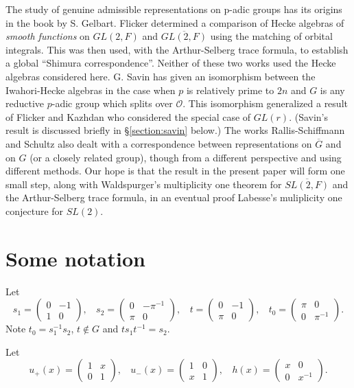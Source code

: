 \documentclass[12pt,letterpaper]{amsart}
\theoremstyle{definition}
\theoremstyle{remark}
\begin{document}
The study of genuine admissible representations
on p-adic groups has its origins in the
book \cite{G} by S. Gelbart. Flicker \cite{F}
determined a comparison of Hecke algebras of
{\it smooth functions} on $GL(2,F)$ and 
$\overline{GL(2,F)}$ using the matching of orbital integrals.
This was then used, with the Arthur-Selberg trace formula, to 
establish a global ``Shimura correspondence''.
Neither of these two works used the Hecke algebras considered here.
G. Savin \cite{S} has given an isomorphism between
the Iwahori-Hecke algebras in the case when $p$ is
relatively prime to $2n$ and $G$ is any reductive
$p$-adic group which splits over $\mathcal{O}$. This isomorphism 
generalized a result of Flicker and Kazhdan \cite{FK} who
considered the special case of $GL(r)$. 
(Savin's result is discussed briefly
in \S \ref{section:savin} below.)
The works Rallis-Schiffmann \cite{RS} and Schultz
\cite{Sch} also dealt with a correspondence between
representations on $\overline{G}$ and on $G$ (or a closely related 
group),
though from a different perspective and using different methods.
Our hope is that the result in the present paper will form
one small step, along with Waldspurger's
multiplicity one theorem for $\overline{SL(2,F)}$ 
\cite{W} and the Arthur-Selberg trace formula, in an eventual proof 
Labesse's muliplicity one conjecture for $SL(2)$. 

\section{Some notation}

Let
\[
s_1=
\left(
\begin{array}{cc}
0 & -1\\
1 & 0
\end{array}
\right),\ \ \ \ 
s_2=
\left(
\begin{array}{cc}
0 & -\pi^{-1}\\
\pi & 0
\end{array}
\right),\ \ \ \ 
t=
\left(
\begin{array}{cc}
0 & -1\\
\pi & 0
\end{array}
\right),\ \ \ \ 
t_0=
\left(
\begin{array}{cc}
\pi & 0 \\
0 & \pi^{-1}
\end{array}
\right).
\]
Note $t_0=s_1^{-1}s_2$, $t\notin G$ and $ts_1t^{-1}=s_2$. 

Let
\[
u_+(x)=\left(
\begin{array}{cc}
1 & x\\
0 & 1
\end{array}
\right),\ \ \ \ 
u_-(x)=\left(
\begin{array}{cc}
1 & 0\\
x & 1
\end{array}
\right),\ \ \ \ 
h(x)=\left(
\begin{array}{cc}
x & 0\\
0 & x^{-1}
\end{array}
\right).
\]
\end{document}
